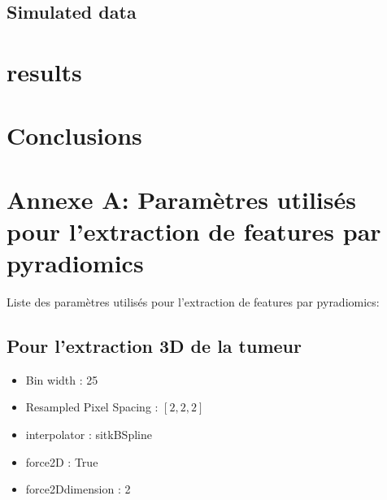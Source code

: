 \documentclass[10pt]{article}
\begin{document}
\subsection{Simulated data}


\vspace{10 pt}













\vspace{2 cm}

\section{results}




\section*{Conclusions}
\blindtext






\newpage

\appendix

\section{Annexe A: Paramètres utilisés pour l'extraction de features par pyradiomics}
\label{annexeA}

Liste des paramètres utilisés pour l'extraction de features par pyradiomics:

\subsection{Pour l'extraction 3D de la tumeur}
 
\begin{itemize}[label = $\bullet$]
    \item Bin width : 25
    \item Resampled Pixel Spacing : $[2,2,2]$
    \item interpolator : sitkBSpline
    \item force2D : True
    \item force2Ddimension : 2
\end{itemize}
\end{document}
